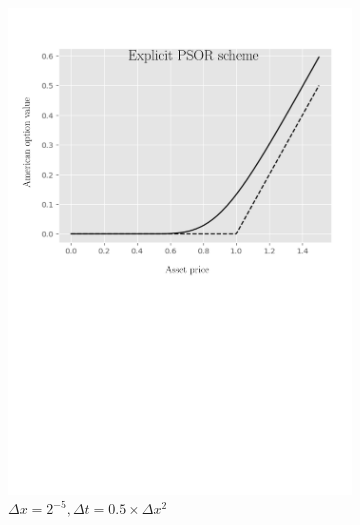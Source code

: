 \begin{figure}[H]
\begin{subfigure}{0.4\textwidth}
    \includegraphics[width=\textwidth]{chapters/chapter5/TestCase1ExplicitLCP.pdf}
    \caption{$\Delta{x}=2^{-5}, \Delta{t}=0.5\times\Delta{x}^2$}
    \label{fig:lcp:numericaresults:test_case_1_explicit}
  \end{subfigure}
  \begin{subfigure}{0.4\textwidth}
    \centering

\end{subfigure}
\end{figure}
